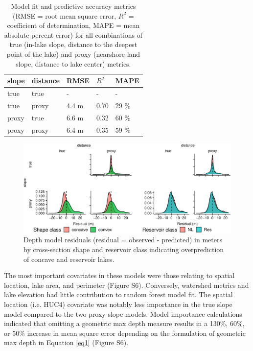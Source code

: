 \documentclass[draft]{agujournal2019}
\begin{document}
\begin{table}[h]
  \caption{Model fit and predictive accuracy metrics (RMSE = root mean square error, $R^2$ = coefficient of determination, MAPE = mean absolute percent error) for all combinations of true (in-lake slope, distance to the deepest point of the lake) and proxy (nearshore land slope, distance to lake center) metrics.} \label{table1}
  \centering
\begin{tabular}{lllll}
  \hline
  slope & distance & RMSE & $R^2$ & MAPE\\
  \hline
  true & true & - & - & -\\
  true & proxy & 4.4 m & 0.70 & 29 \%\\
  proxy & true & 6.6 m & 0.32 & 60 \%\\
  proxy & proxy & 6.4 m & 0.35 & 59 \%\\
  \hline
\end{tabular}
\end{table}

\begin{figure}
  \begin{center}
    \includegraphics[width=\textwidth,keepaspectratio]{../figures/02_depth_model_grid_resid-1}
  \end{center}
  \caption{Depth model residuals (residual  = observed - predicted) in meters by cross-section shape and reservoir class indicating overprediction of concave and reservoir lakes.}\label{fig4}
\end{figure}

The most important covariates in these models were those relating to spatial location, lake area, and perimeter (Figure S6). Conversely, watershed metrics and lake elevation had little contribution to random forest model fit. The spatial location (i.e. HUC4) covariate was notably less importance in the true slope model compared to the two proxy slope models. Model importance calculations indicated that omitting a geometric max depth measure results in a 130\%, 60\%, or 50\% increase in mean square error depending on the formulation of geometric max depth in Equation \ref{eq1} (Figure S6).
\end{document}
